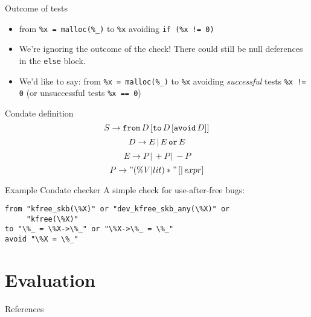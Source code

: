 \documentclass{beamer}
\begin{document}
\begin{frame}{Outcome of tests}
\begin{itemize}
\item from {\tt \%x = malloc(\%\_)} to {\tt *\%x} avoiding {\tt if (\%x != 0)}
\item We're ignoring the outcome of the check! There could still be null
deferences in the {\tt else} block.
\item We'd like to say: from {\tt \%x = malloc(\%\_)} to {\tt *\%x} avoiding \emph{successful} tests {\tt \%x != 0} (or unsuccessful tests {\tt \%x == 0})
\end{itemize}
\end{frame}

\begin{frame}{Condate definition}
$$ S \rightarrow {\tt from} \, D \,  [{\tt to} \, D \, [{\tt avoid} \, D]] $$
$$ D \rightarrow E \, | \, E \, {\tt or } \, E $$
$$ E \rightarrow P \, | \, +P \, | \, -P $$
$$ P \rightarrow "(\%V | lit)*" \, [|\, expr] $$
\end{frame}

\begin{frame}[fragile]{Example Condate checker}
A simple check for use-after-free bugs:
\begin{verbatim}
from "kfree_skb(\%X)" or "dev_kfree_skb_any(\%X)" or 
     "kfree(\%X)"
to "\%_ = \%X->\%_" or "\%X->\%_ = \%_"
avoid "\%X = \%_"
\end{verbatim}
\end{frame}
\section{Evaluation}

\begin{frame}{References}

{\footnotesize
}
\end{frame}
\end{document}
